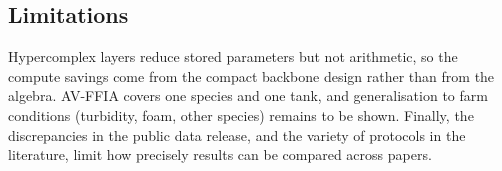\begin{table}[t]
  \centering
  \caption{Training-form versus reparameterised (deployed) model. Stored: parameters kept on disk and
  transmitted; Dense: parameters in memory after reparameterisation.}
  \label{tab:deploy}
  \footnotesize
\end{table}

\subsection{Limitations}
\label{sec:limitations}
Hypercomplex layers reduce stored parameters but not arithmetic, so the compute savings come from the
compact backbone design rather than from the algebra. AV-FFIA covers one species and one tank, and
generalisation to farm conditions (turbidity, foam, other species) remains to be shown. Finally, the
discrepancies in the public data release, and the variety of protocols in the literature, limit how
precisely results can be compared across papers.
